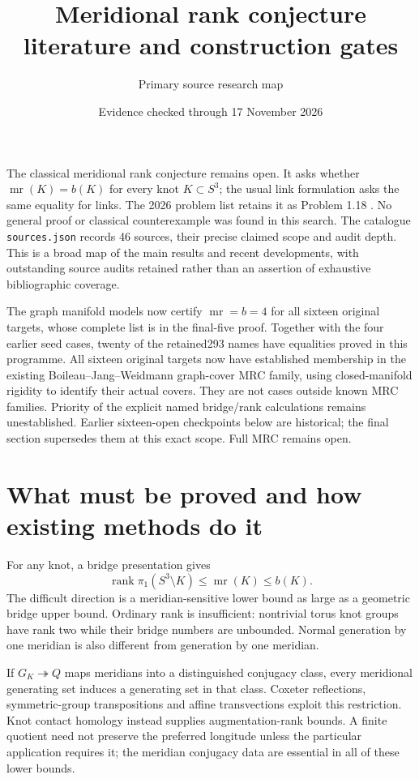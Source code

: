 \documentclass[11pt]{article}
\title{Meridional rank conjecture literature and construction gates}
\author{Primary source research map}
\date{Evidence checked through 17 November 2026}
\newcommand{\mr}{\operatorname{mr}}
\begin{document}
\maketitle

The classical meridional rank conjecture remains open. It asks whether
$\mr(K)=b(K)$ for every knot $K\subset S^3$; the usual link formulation asks
the same equality for links. The 2026 problem list retains it as Problem
1.18 \cite{k3}. No general proof or classical counterexample was found in
this search. The catalogue \texttt{sources.json} records 46 sources,
their precise claimed scope and audit depth. This is a broad map of the
main results and recent developments, with outstanding source audits
retained rather than an assertion of exhaustive bibliographic coverage.

The graph manifold models now certify $\mr=b=4$ for all sixteen original
targets, whose complete list is in the final-five proof.
Together with the four earlier
seed cases, twenty of the retained293 names have equalities proved in
this programme. All sixteen original targets now have established
membership in the existing Boileau--Jang--Weidmann graph-cover MRC family,
using closed-manifold rigidity to identify their actual covers.
They are not cases outside known MRC families. Priority of the explicit
named bridge/rank calculations remains unestablished.
Earlier sixteen-open checkpoints below are historical; the final section
supersedes them at this exact scope. Full MRC remains open.

\section{What must be proved and how existing methods do it}

For any knot, a bridge presentation gives
\[
 \operatorname{rank}\pi_1(S^3\setminus K)\le\mr(K)\le b(K).
\]
The difficult direction is a meridian-sensitive lower bound as large as
a geometric bridge upper bound. Ordinary rank is insufficient: nontrivial
torus knot groups have rank two while their bridge numbers are unbounded.
Normal generation by one meridian is also different from generation by
one meridian.

If $G_K\twoheadrightarrow Q$ maps meridians into a distinguished conjugacy
class, every meridional generating set induces a generating set in that
class. Coxeter reflections, symmetric-group transpositions and affine
transvections exploit this restriction. Knot contact homology instead
supplies augmentation-rank bounds. A finite quotient need not preserve the
preferred longitude unless the particular application requires it; the
meridian conjugacy data are essential in all of these lower bounds.
\end{document}

